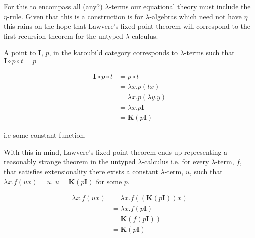 \documentclass[ %
                author={Alessio Zakaria},
                supervisor={Dr. Nicolas Wu},
                degree={MEng},
                title={Automated Theorem Proving in Category Theory and the
                $\lambda$-calculus},
                subtitle={},
                type={Research},
                year={2019} ]{dissertation}
\begin{document}
For this to encompass all (any?) $\lambda$-terms our equational theory must
include the $\eta$-rule. Given that this is a construction is for
$\lambda$-algebras which need not have $\eta$ this rains on the hope that
Lawvere's fixed point theorem will correspond to the first recursion theorem for
the untyped $\lambda$-calculus.

A point to \textbf{I}, $p$, in the karoubi'd category corresponds to $\lambda$-terms such
that $\textbf{I} \circ p \circ t = p$

\begin{align*}
    \textbf{I} \circ p \circ t &= p \circ t \\
    &= \lambda x . p (t x) \\
    &= \lambda x . p (\lambda y . y) \\
    &= \lambda x . p \textbf{I} \\
    &= \textbf{K} (p \textbf{I})
\end{align*}

i.e some constant function.

With this in mind, Lawvere's fixed point theorem ends up representing a
reasonably strange theorem in the untyped $\lambda$-calculus i.e. for every
$\lambda$-term, $f$, that satisfies extensionality there exists a constant
$\lambda$-term, $u$, such that $\lambda x . f (u x) = u$. $u =
\textbf{K}(p\textbf{I})$ for some $p$.

\begin{align*}
    \lambda x . f (u x ) &= \lambda x . f(( \textbf{K} (p \textbf{I})) x) \\
    &= \lambda x . f(p \textbf{I}) \\
    &= \textbf{K} (f (p \textbf{I})) \\
    &= \textbf{K} (p \textbf{I})
\end{align*}


\end{document}
